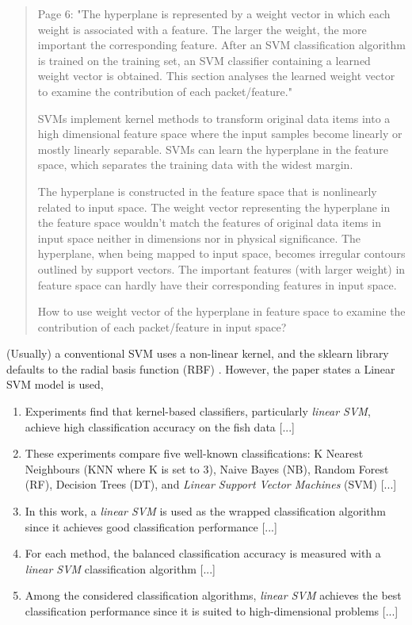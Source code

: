 \documentclass[runningheads]{llncs}
\begin{document}
\begin{quote}
  Page 6: "The hyperplane is represented by a weight vector in which each weight is associated with a feature. The larger the weight, the more important the corresponding feature. After an SVM classification algorithm is trained on the training set, an SVM classifier containing a learned weight vector is obtained. This section analyses the learned weight vector to examine the contribution of each packet/feature."

  SVMs implement kernel methods to transform original data items into a high dimensional feature space where the input samples become linearly or mostly linearly separable. SVMs can learn the hyperplane in the feature space, which separates the training data with the widest margin.

  The hyperplane is constructed in the feature space that is nonlinearly related to input space. The weight vector representing the hyperplane in the feature space wouldn't match the features of original data items in input space neither in dimensions nor in physical significance. The hyperplane, when being mapped to input space, becomes irregular contours outlined by support vectors. The important features (with larger weight) in feature space can hardly have their corresponding features in input space.

  How to use weight vector of the hyperplane in feature space to examine the contribution of each packet/feature in input space?
\end{quote}

(Usually) a conventional SVM uses a non-linear kernel, and the sklearn library defaults to the radial basis function (RBF) \cite{sklearn2021feature}. 
However, the paper states a Linear SVM model is used,

\begin{enumerate}
  \item  Experiments find that kernel-based classifiers, particularly \emph{linear SVM}, achieve high classification accuracy on the fish data [...]
  \item These experiments compare five well-known classifications: K Nearest Neighbours (KNN where K is set to 3), Naive Bayes (NB), Random Forest (RF), Decision Trees (DT), and \emph{Linear Support Vector Machines} (SVM) [...]
  \item In this work, a \emph{linear SVM} is used as the wrapped classification algorithm since it achieves good classification performance [...]
  \item For each method, the balanced classification accuracy is measured with a \emph{linear SVM} classification algorithm \cite{sklearn2021feature} [...]
  \item Among the considered classification algorithms, \emph{linear SVM} achieves the best classification performance since it is suited to high-dimensional problems [...]
\end{enumerate}
\end{document}
